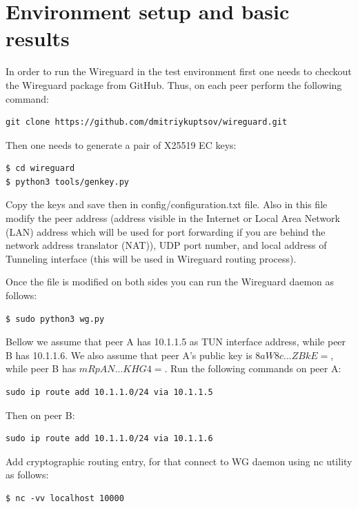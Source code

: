 \section{Environment setup and basic results}
\label{section:results}

In order to run the Wireguard in the test environment first one needs to
checkout the Wireguard package from GitHub. Thus, on each peer perform the 
following command:

\begin{verbatim}
git clone https://github.com/dmitriykuptsov/wireguard.git
\end{verbatim}

Then one needs to generate a pair of X25519 EC keys:

\begin{verbatim}
$ cd wireguard
$ python3 tools/genkey.py
\end{verbatim}

Copy the keys and save then in config/configuration.txt file. Also in this file modify the 
peer address (address visible in the Internet or Local Area Network (LAN) address which will be used for 
port forwarding if you are behind the network address translator (NAT)), UDP port number, and local
address of Tunneling interface (this will be used in Wireguard routing process). 

Once the file is modified on both sides you can run the Wireguard daemon as follows:

\begin{verbatim}
$ sudo python3 wg.py
\end{verbatim}

Bellow we assume that peer A has 10.1.1.5 as TUN interface address, while peer B has 10.1.1.6.
We also assume that peer A's public key is $8aW8c...ZBkE=$, while peer B has $mRpAN...KHG4=$.
Run the following commands on peer A:

\begin{verbatim}
sudo ip route add 10.1.1.0/24 via 10.1.1.5
\end{verbatim}

Then on peer B:

\begin{verbatim}
sudo ip route add 10.1.1.0/24 via 10.1.1.6
\end{verbatim}

Add cryptographic routing entry, for that connect to WG daemon using nc utility as follows:

\begin{small}
\begin{verbatim}
$ nc -vv localhost 10000
\end{verbatim}
\end{small}

